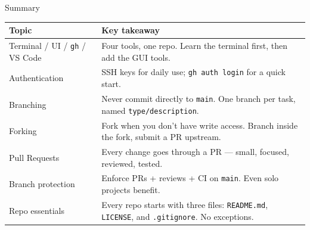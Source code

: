 \documentclass[aspectratio=169, 11pt]{beamer}
\begin{document}
\begin{frame}{Summary}
  \begin{table}
    \centering
    \begin{tabular}{@{} l p{10cm} @{}}
      \toprule
      \textbf{Topic} & \textbf{Key takeaway} \\
      \midrule
      Terminal / UI / \texttt{gh} / VS Code & Four tools, one repo. Learn the terminal first, then add the GUI tools. \\
      Authentication & SSH keys for daily use; \texttt{gh auth login} for a quick start. \\
      Branching  & Never commit directly to \texttt{main}. One branch per task, named \texttt{type/description}. \\
      Forking    & Fork when you don't have write access. Branch inside the fork, submit a PR upstream. \\
      Pull Requests & Every change goes through a PR --- small, focused, reviewed, tested. \\
      Branch protection & Enforce PRs + reviews + CI on \texttt{main}. Even solo projects benefit. \\
      Repo essentials & Every repo starts with three files: \texttt{README.md}, \texttt{LICENSE}, and \texttt{.gitignore}. No exceptions. \\
      \bottomrule
    \end{tabular}
  \end{table}
\end{frame}
\end{document}
